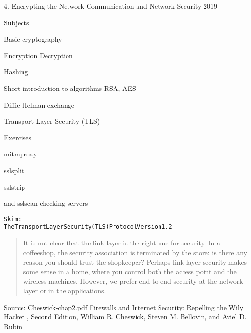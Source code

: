 \documentclass[Screen16to9,17pt]{foils}
\begin{document}
\mytitlepage
{4. Encrypting the Network}
{Communication and Network Security 2019}



\begin{list1}
\item Subjects
\begin{list2}
\item Basic cryptography
\item Encryption Decryption
\item Hashing
\item Short introduction to algorithms RSA, AES
\item Diffie Helman exchange
\item Transport Layer Security (TLS)
\end{list2}
\item Exercises
\begin{list2}
\item mitmproxy 
\item sslsplit 
\item sslstrip 
\item {} and sslscan checking servers
\end{list2}
\end{list1}



\begin{alltt}\footnotesize
Skim:\\
 The Transport Layer Security (TLS) Protocol Version 1.2\\
\end{alltt}

\begin{list1}
\item
\begin{list2}
\item
\end{list2}
\end{list1}



\begin{quote}
It is not clear that the link layer is the right one for security. In a coffeeshop, the security association is terminated by the store: is there any reason you should trust the shopkeeper? Perhaps link-layer security makes some sense in a home, where you control both the access point and the wireless machines. However, we prefer end-to-end security at the network layer or in the
applications.
\end{quote} Source: Cheswick-chap2.pdf Firewalls and Internet Security: Repelling the Wily Hacker , Second Edition, William R. Cheswick, Steven M. Bellovin, and Aviel D. Rubin
\end{document}
